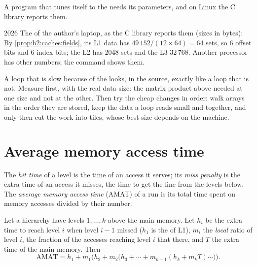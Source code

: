 A program that tunes itself to the  needs its parameters, and on Linux the C library reports them.

\begin{dated}{2026}
The  of the author's laptop, as the C library reports them (sizes in bytes):
\label{out:b2:caches:getconf}
By \cref{prop:b2:caches:fields}, its L1 data  has $49\,152 / (12 \times 64) = 64$ sets, so 6 offset bits and
6 index bits; the L2 has 2048 sets and the L3 32\,768. Another processor has other numbers; the command shows them.
\end{dated}

\begin{inpractice}
A loop that is slow because of the  looks, in the source, exactly like a loop that is not. Measure first, with
the real data size: the matrix product above needed  at one size and not at the other. Then try the cheap
changes in order: walk arrays in the order they are stored, keep the data a loop reads small and together, and only
then cut the work into tiles, whose best size depends on the machine.
\end{inpractice}

\section{Average memory access time}\label{sec:b2:caches:amat}

\begin{definition}\label{def:b2:caches:amat}
The \emph{hit time} of a level is the time of an access it serves; its \emph{miss
penalty} is the extra time of an access it misses, the time to get the line from the levels
below. The \emph{average memory access time} (AMAT) of a run is its total time
spent on memory accesses divided by their number.
\end{definition}

\begin{proposition}\label{prop:b2:caches:amat}
Let a hierarchy have  levels $1, \dots, k$ above the main memory. Let $h_i$ be the extra time to reach level
$i$ when level $i - 1$ missed ($h_1$ is the  of L1), $m_i$ the \emph{local}  ratio of level $i$, the
fraction of the accesses reaching level $i$ that  there, and $T$ the extra time of the main memory. Then
\[
\mathrm{AMAT} = h_1 + m_1\bigl(h_2 + m_2\bigl(h_3 + \cdots + m_{k-1}(h_k + m_k T)\cdots\bigr)\bigr).
\]
\end{proposition}

